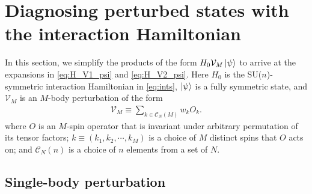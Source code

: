 \documentclass[nofootinbib,notitlepage,11pt]{revtex4-2}
\newcommand{\p}[1]{\left(#1\right)} %
\newcommand{\1}{\mathds{1}}
\newcommand{\C}{\mathcal{C}}
\newcommand{\V}{\mathcal{V}}
\begin{document}
\section{Diagnosing perturbed states with the interaction Hamiltonian}
\label{sec:H_VM_psi}

In this section, we simplify the products of the form
$H_0\V_M\ket\psi$ to arrive at the expansions in \eqref{eq:H_V1_psi}
and \eqref{eq:H_V2_psi}.  Here $H_0$ is the SU($n$)-symmetric
interaction Hamiltonian in \eqref{eq:ints}, $\ket\psi$ is a fully
symmetric state, and $\V_M$ is an $M$-body perturbation of the form
\begin{align}
  \V_M \equiv \sum_{k\in\C_N\p{M}} w_k O_k.
\end{align}
where $O$ is an $M$-spin operator that is invariant under arbitrary
permutation of its tensor factors; $k\equiv\p{k_1,k_2,\cdots,k_M}$ is
a choice of $M$ distinct spins that $O$ acts on; and $\C_N\p{n}$ is a
choice of $n$ elements from a set of $N$.

\subsection{Single-body perturbation}
\label{sec:H_V1_psi}
\end{document}
